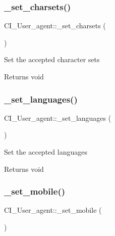 \subsubsection{\texorpdfstring{\+\_\+set\+\_\+charsets()}{\_set\_charsets()}}
{\footnotesize\ttfamily C\+I\+\_\+\+User\+\_\+agent\+::\+\_\+set\+\_\+charsets (\begin{DoxyParamCaption}{ }\end{DoxyParamCaption})\hspace{0.3cm}{\ttfamily [protected]}}

Set the accepted character sets

\begin{DoxyReturn}{Returns}
void 
\end{DoxyReturn}
\mbox{\label{class_c_i___user__agent_aa08de592d3ee8dec25aa869789b19964}} 
\subsubsection{\texorpdfstring{\+\_\+set\+\_\+languages()}{\_set\_languages()}}
{\footnotesize\ttfamily C\+I\+\_\+\+User\+\_\+agent\+::\+\_\+set\+\_\+languages (\begin{DoxyParamCaption}{ }\end{DoxyParamCaption})\hspace{0.3cm}{\ttfamily [protected]}}

Set the accepted languages

\begin{DoxyReturn}{Returns}
void 
\end{DoxyReturn}
\mbox{\label{class_c_i___user__agent_aa0d36a9af99e7ec22e57ea30c7a97cb4}} 
\subsubsection{\texorpdfstring{\+\_\+set\+\_\+mobile()}{\_set\_mobile()}}
{\footnotesize\ttfamily C\+I\+\_\+\+User\+\_\+agent\+::\+\_\+set\+\_\+mobile (\begin{DoxyParamCaption}{ }\end{DoxyParamCaption})\hspace{0.3cm}{\ttfamily [protected]}}

